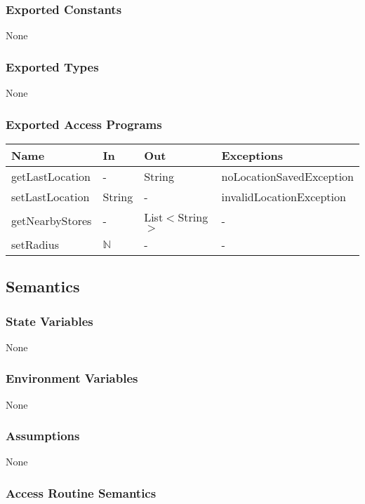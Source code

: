 \documentclass[12pt, titlepage]{article}
\begin{document}
\subsubsection{Exported Constants}
None

\subsubsection{Exported Types}
None

\subsubsection{Exported Access Programs}

\begin{center}
\begin{tabular}{p{5cm} p{3cm} p{3cm} p{5cm}}
\hline
\textbf{Name} & \textbf{In} & \textbf{Out} & \textbf{Exceptions} \\
\hline
getLastLocation & - & String & noLocationSavedException \\
setLastLocation & String & - & invalidLocationException \\
getNearbyStores & - & List$<$String$>$ & - \\
setRadius & $\mathbb{N}$ & - & - \\
\hline
\end{tabular}
\end{center}

\subsection{Semantics}

\subsubsection{State Variables}
None

\subsubsection{Environment Variables}
None

\subsubsection{Assumptions}
None

\subsubsection{Access Routine Semantics}
\end{document}
